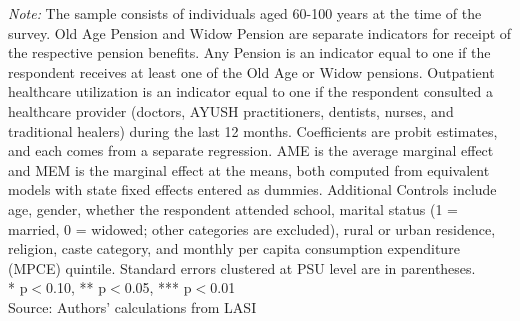 \begin{table}[H]
{}
\vspace{2mm}
\begin{minipage}{0.95\textwidth}
\footnotesize \textit{Note:} The sample consists of individuals aged 60-100 years at the time of the survey. Old Age Pension and Widow Pension are separate indicators for receipt of the respective pension benefits. Any Pension is an indicator equal to one if the respondent receives at least one of the Old Age or Widow pensions. Outpatient healthcare utilization is an indicator equal to one if the respondent consulted a healthcare provider (doctors, AYUSH practitioners, dentists, nurses, and traditional healers) during the last 12 months. Coefficients are probit estimates, and each comes from a separate regression. AME is the average marginal effect and MEM is the marginal effect at the means, both computed from equivalent models with state fixed effects entered as dummies. Additional Controls include age, gender, whether the respondent attended school, marital status (1 = married, 0 = widowed; other categories are excluded), rural or urban residence, religion, caste category, and monthly per capita consumption expenditure (MPCE) quintile. Standard errors clustered at PSU level are in parentheses. \\ * p$<$0.10, ** p$<$0.05, *** p$<$0.01\\
Source: Authors' calculations from LASI
\end{minipage}
\end{table}
